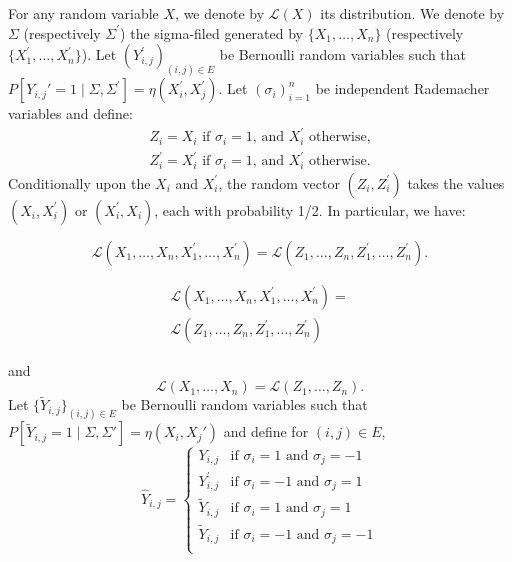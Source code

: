 \documentclass[letterpaper]{article} %
\def\DoubleColumn{}
\def\DoubleColumnEnd{}
\def\SingleColumn{}
\def\SingleColumnEnd{}
\newcommand{\Pro}{P}
\newcommand{\pair}[1]{(#1)}
\newcommand{\set}[1]{\{#1\}}
\begin{document}
    For any random variable $X$, we denote by $\mathcal L(X)$ its distribution. We denote by $\Sigma$ (respectively $\Sigma^\prime$) the sigma-filed generated by $\{X_1,\dots,X_n\}$ (respectively $\{X_1^\prime,\dots,X_n^\prime\}$). Let $(Y_{i,j}^\prime)_{(i,j)\in E}$ be Bernoulli random variables such that $\Pro[Y_{i,j}'=1\mid \Sigma, \Sigma^\prime]=\eta(X_i^\prime, X_j^\prime)$. Let $(\sigma_i)_{i=1}^n$ be independent Rademacher variables and define:
    \begin{align*}
        Z_i = X_i \text{ if } \sigma_i = 1 \text{, and } X_i^\prime \text{ otherwise,}\\
        Z_i^\prime = X_i^\prime \text{ if } \sigma_i = 1 \text{, and } X_i^\prime \text{ otherwise.}
    \end{align*}
    Conditionally upon the $X_i$ and $X_i^\prime$, the random vector $(Z_i, Z_i^\prime)$ takes the values $(X_i, X_i^\prime)$ or $(X_i^\prime, X_i)$, each with probability 1/2. In particular, we have:
    \SingleColumn
    \begin{equation}
        \label{eq:weighted_u_statistics_decoupling_fact1}
        \mathcal L(X_1,\dots,X_n,X_1^\prime,\dots,X_n^\prime) = \mathcal L(Z_1,\dots,Z_n,Z_1^\prime,\dots,Z_n^\prime).
    \end{equation}
    \SingleColumnEnd
    \DoubleColumn
    \begin{equation}
        \begin{aligned}
            \label{eq:weighted_u_statistics_decoupling_fact1}
            \mathcal L(X_1,\dots,X_n,X_1^\prime,\dots,X_n^\prime) =\\ \mathcal L(Z_1,\dots,Z_n,Z_1^\prime,\dots,Z_n^\prime)
        \end{aligned}
    \end{equation}
    \DoubleColumnEnd
    and
    \begin{equation}
        \label{eq:weighted_u_statistics_decoupling_fact2}
        \mathcal L(X_1,\dots,X_n) = \mathcal L(Z_1,\dots,Z_n).
    \end{equation}
    Let $\set{\tilde{Y}_{i,j}}_{\pair{i,j}\in E}$ be Bernoulli random variables such that $\Pro[\tilde{Y}_{i,j}=1 \mid \Sigma,\Sigma'] = \eta(X_i, X_j')$ and define for $\pair{i,j}\in E$,
    \begin{equation*}
        \hat{Y}_{i,j}=\begin{cases}
            Y_{i,j}&\text{if } \sigma_i=1\text{ and } \sigma_j=-1\\
            Y_{i,j}^\prime&\text{if } \sigma_i=-1\text{ and } \sigma_j=1\\
            \tilde{Y}_{i,j}&\text{if } \sigma_i=1\text{ and } \sigma_j=1\\
            \tilde{Y}_{i,j}&\text{if } \sigma_i=-1\text{ and } \sigma_j=-1\\
        \end{cases}
    \end{equation*}
\end{document}
